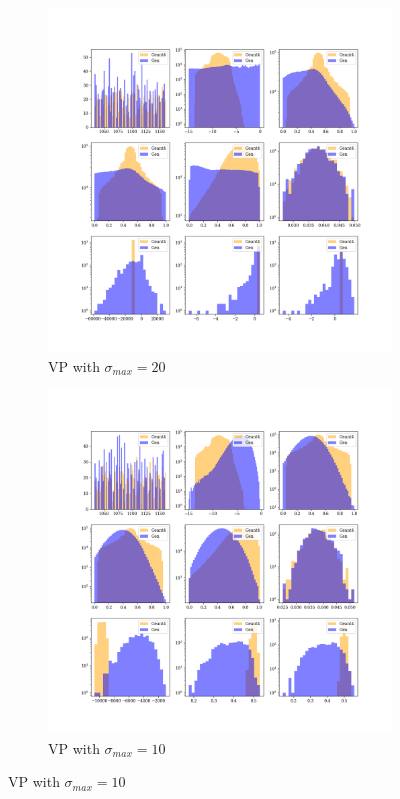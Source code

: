 \begin{figure}[htbp]
    \centering
    \begin{subfigure}[b]{0.4\textwidth} %
        \includegraphics[width=\textwidth]{Figures/vp_20.png}
        \caption{VP with $\sigma_{max} = 20$}
        \label{fig:vp_20}
    \end{subfigure}
    \hspace{0.015\textwidth} %
    \begin{subfigure}[b]{0.4\textwidth}
        \includegraphics[width=\textwidth]{Figures/vp_10.png}
        \caption{VP with $\sigma_{max} = 10$}
        \label{fig:vp_10}
    \end{subfigure}
    

\end{figure}
